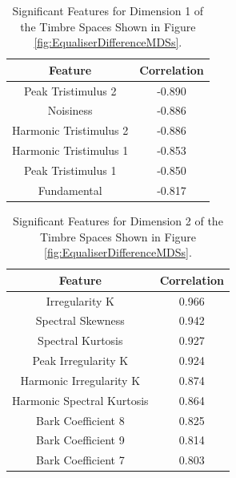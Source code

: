 		\begin{table}[h!]
			\centering
			\begin{tabular}{|c|c|}
				\hline
				\bf{Feature} & \bf{Correlation} \\
				\hline
				\hline
				Peak Tristimulus 2 & -0.890 \\
				\hline
				Noisiness & -0.886 \\
				\hline
				Harmonic Tristimulus 2 & -0.886 \\
				\hline
				Harmonic Tristimulus 1 & -0.853 \\
				\hline
				Peak Tristimulus 1 & -0.850 \\
				\hline
				Fundamental & -0.817 \\
				\hline
			\end{tabular}
			\caption{Significant Features for Dimension 1 of the Timbre Spaces Shown in Figure 
				 \ref{fig:EqualiserDifferenceMDSs}.}
			\label{tab:EqualiserDifferenceFeatures}
		\end{table}

		\begin{table}[h!]
			\centering
			\begin{tabular}{|c|c|}
				\hline
				\bf{Feature} & \bf{Correlation} \\
				\hline
				\hline
				Irregularity K & 0.966 \\
				\hline
				Spectral Skewness & 0.942 \\
				\hline
				Spectral Kurtosis & 0.927 \\
				\hline
				Peak Irregularity K & 0.924 \\
				\hline
				Harmonic Irregularity K & 0.874 \\
				\hline
				Harmonic Spectral Kurtosis & 0.864 \\
				\hline
				Bark Coefficient 8 & 0.825 \\
				\hline
				Bark Coefficient 9 & 0.814 \\
				\hline
				Bark Coefficient 7 & 0.803 \\
				\hline
			\end{tabular}
			\caption{Significant Features for Dimension 2 of the Timbre Spaces Shown in Figure 
				 \ref{fig:EqualiserDifferenceMDSs}.}
			\label{tab:EqualiserDifferenceFeatures}
		\end{table}
